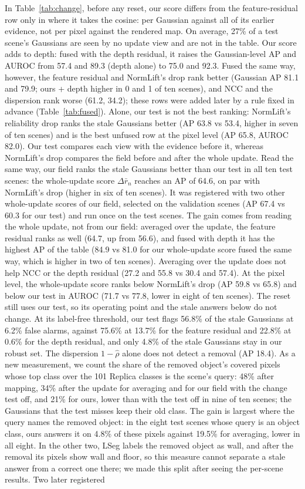 \documentclass[journal]{IEEEtran}
\begin{document}
In Table~\ref{tab:change}, before any reset, our score differs from the feature-residual row only in where it takes the cosine: per Gaussian against all of its earlier evidence, not per pixel against the rendered map. On average, 27\% of a test scene's Gaussians are seen by no update view and are not in the table. Our score adds to depth: fused with the depth residual, it raises the Gaussian-level AP and AUROC from 57.4 and 89.3 (depth alone) to 75.0 and 92.3. Fused the same way, however, the feature residual and NormLift's drop rank better (Gaussian AP 81.1 and 79.9; ours + depth higher in 0 and 1 of ten scenes), and NCC and the dispersion rank worse (61.2, 34.2); these rows were added later by a rule fixed in advance (Table~\ref{tab:fused}). Alone, our test is not the best ranking: NormLift's reliability drop ranks the stale Gaussians better (AP 63.8 vs 53.4, higher in seven of ten scenes) and is the best unfused row at the pixel level (AP 65.8, AUROC 82.0). Our test compares each view with the evidence before it, whereas NormLift's drop compares the field before and after the whole update. Read the same way, our field ranks the stale Gaussians better than our test in all ten test scenes: the whole-update score $\Delta\bar r_n$ reaches an AP of 64.6, on par with NormLift's drop (higher in six of ten scenes). It was registered with two other whole-update scores of our field, selected on the validation scenes (AP 67.4 vs 60.3 for our test) and run once on the test scenes. The gain comes from reading the whole update, not from our field: averaged over the update, the feature residual ranks as well (64.7, up from 56.6), and fused with depth it has the highest AP of the table (84.9 vs 81.0 for our whole-update score fused the same way, which is higher in two of ten scenes). Averaging over the update does not help NCC or the depth residual (27.2 and 55.8 vs 30.4 and 57.4). At the pixel level, the whole-update score ranks below NormLift's drop (AP 59.8 vs 65.8) and below our test in AUROC (71.7 vs 77.8, lower in eight of ten scenes). The reset still uses our test, so its operating point and the stale answers below do not change. At its label-free threshold, our test flags 56.8\% of the stale Gaussians at 6.2\% false alarms, against 75.6\% at 13.7\% for the feature residual and 22.8\% at 0.6\% for the depth residual, and only 4.8\% of the stale Gaussians stay in our robust set. The dispersion $1-\hat\rho$ alone does not detect a removal (AP 18.4). As a new measurement, we count the share of the removed object's covered pixels whose top class over the 101 Replica classes is the scene's query: 48\% after mapping, 34\% after the update for averaging and for our field with the change test off, and 21\% for ours, lower than with the test off in nine of ten scenes; the Gaussians that the test misses keep their old class. The gain is largest where the query names the removed object: in the eight test scenes whose query is an object class, ours answers it on 4.8\% of these pixels against 19.5\% for averaging, lower in all eight. In the other two, LSeg labels the removed object as wall, and after the removal its pixels show wall and floor, so this measure cannot separate a stale answer from a correct one there; we made this split after seeing the per-scene results. Two later registered 
\end{document}
